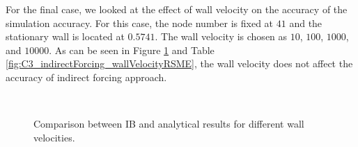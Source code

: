 For the final case, we looked at the effect of wall velocity on the accuracy of the simulation accuracy. For this case, the node number is fixed at $41$ and the stationary wall is located at $0.5741$. The wall velocity is chosen as $10$, $100$, $1000$, and $10000$. As can be seen in Figure \ref{fig:C3_indirectForcing_wallVelocity} and Table \ref{fig:C3_indirectForcing_wallVelocityRSME}, the wall velocity does not affect the accuracy of indirect forcing approach.

\begin{figure}[H]
	\centering
	\quad
	\\
	\quad
	\caption{Comparison between IB and analytical results for different wall velocities.}
	\label{fig:C3_indirectForcing_wallVelocity}
\end{figure}

